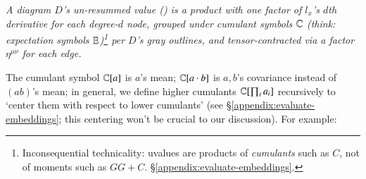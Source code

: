             \squash
            \begin{dfn}[\S\ref{appendix:evaluate-embeddings}]\label{dfn:uvalue-body}
                \emph{
                    A diagram $D$'s \emph{un-resummed value} ()
                    is a product with one factor of $l_x$'s $d$th derivative
                    for each degree-$d$ node, grouped
                    under cumulant symbols $\mathbb{C}$ (think: expectation symbols $\mathbb{E}$)\footnote{
                        Inconsequential technicality: uvalues are products of
                        \emph{cumulants} such as $C$, not of moments such as
                        $GG+C$.
                        \S\ref{appendix:evaluate-embeddings}.
                    }
                    per $D$'s gray outlines, and tensor-contracted 
                    via a %
                    factor $\eta^{\mu\nu}$ for each edge.
                }\mend
            \end{dfn}
            The cumulant symbol $\mathbb{C}[a]$ is $a$'s mean; $\mathbb{C}[a\cdot b]$ is
            $a,b$'s covariance instead of $(ab)$'s mean; in general, we
            define higher cumulants $\mathbb{C}[\prod_i a_i]$ recursively to `center
            them with respect to lower cumulants' (see 
            \S\ref{appendix:evaluate-embeddings};
            this centering won't be crucial to our discussion).  For example:
                \newcommand{\AAA}{{\color{black}\nabla_\mu}}
                \newcommand{\BBB}{{\color{black}\nabla_\nu}}
                \newcommand{\CCC}{{\color{black}\nabla_\xi}}
                \newcommand{\DDD}{{\color{black}\nabla_\omicron}}
                \newcommand{\EEE}{{\color{black}\nabla_\pi}}
                \newcommand{\FFF}{{\color{black}\nabla_\rho}}
                \newcommand{\ww}[1]{\,\CC[#1]\,}%
                \newcommand{\rRr}[1]{{\color{moor}#1}}
                \newcommand{\gGg}[1]{{\color{moog}#1}}
                \newcommand{\bBb}[1]{{\color{moob}#1}}
                \newcommand{\sixsum}{\textstyle\sum_{{\mu\nu\xi\omicron\pi\rho}} }
